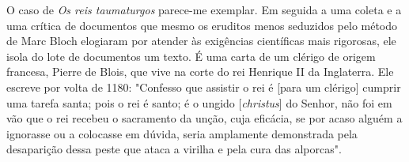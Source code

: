 \documentclass[a5paper]{book}
\begin{document}
O caso de \textit{Os reis taumaturgos} parece-me exemplar. Em seguida a uma coleta e a uma crítica de documentos que mesmo os eruditos menos seduzidos pelo método de Marc Bloch elogiaram por atender às exigências científ{\kern0pt}icas mais rigorosas, ele isola do lote de documentos um texto. É uma carta de um clérigo de origem francesa, Pierre de Blois, que vive na corte do rei Henrique II da Inglaterra. Ele escreve por volta de 1180: "Confesso que assistir o rei é [para um clérigo] cumprir uma tarefa santa; pois o rei é santo; é o ungido [\textit{christus}] do Senhor, não foi em vão que o rei recebeu o sacramento da unção, cuja ef{\kern0pt}icácia, se por acaso alguém a ignorasse ou a colocasse em dúvida, seria amplamente demonstrada pela desaparição dessa peste que ataca a virilha e pela cura das alporcas".\footnotemark[24]
\end{document}
